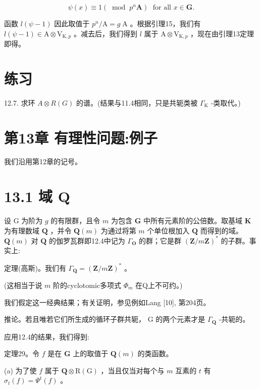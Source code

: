 \documentclass[10pt]{article}
\begin{document}
\[
\psi \left( x\right)  \equiv  1\left( {\;\operatorname{mod}\;{p}^{n}\mathbf{A}}\right) \;\text{ for all }x \in  \mathbf{G}.
\]

函数 \(l\left( {\psi  - 1}\right)\) 因此取值于 \({p}^{n}/\mathrm{A} = g\mathrm{\;A}\) 。根据引理15，我们有 \(l\left( {\psi  - 1}\right)  \in  \mathrm{A} \otimes  {\mathrm{V}}_{\mathrm{K},p}\) 。减去后，我们得到 \(l\) 属于 \(\mathrm{A} \otimes  {\mathrm{V}}_{\mathrm{K},p}\) ，现在由引理13定理即得。

\section*{练习}

12.7. 求环 \(A \otimes  R\left( G\right)\) 的谱。(结果与11.4相同，只是共轭类被 \({\Gamma }_{\mathrm{K}}\) -类取代。)

\section*{第13章 有理性问题:例子}

我们沿用第12章的记号。

\section*{13.1 域 \(\mathbf{Q}\)}

设 \(\mathrm{G}\) 为阶为 \(g\) 的有限群，且令 \(m\) 为包含 \(\mathbf{G}\) 中所有元素阶的公倍数。取基域 \(\mathbf{K}\) 为有理数域 \(\mathbf{Q}\) ，并令 \(\mathbf{Q}\left( m\right)\) 为通过将第 \(m\) 个单位根加入 \(\mathbf{Q}\) 而得到的域。 \(\mathbf{Q}\left( m\right)\) 对 \(\mathbf{Q}\) 的伽罗瓦群即12.4中记为 \({\Gamma }_{\mathbf{O}}\) 的群；它是群 \({\left( \mathbf{Z}/m\mathbf{Z}\right) }^{ * }\) 的子群。事实上:

定理(高斯)。我们有 \({\Gamma }_{\mathbf{Q}} = {\left( \mathbf{Z}/m\mathbf{Z}\right) }^{ * }\) 。

(这相当于说 \(m\) 阶的cyclotomic多项式 \({\Phi }_{m}\) 在Q上不可约。)

我们假定这一经典结果；有关证明，参见例如Lang [10], 第204页。

推论。若且唯若它们所生成的循环子群共轭， \(\mathrm{G}\) 的两个元素才是 \({\Gamma }_{\mathbf{Q}}\) -共轭的。

应用12.4的结果，我们得到:

定理29。令 \(f\) 是在 \(\mathbf{G}\) 上的取值于 \(\mathbf{Q}\left( m\right)\) 的类函数。

(a) 为了使 \(f\) 属于 \(\mathbf{Q} \otimes  \mathrm{R}\left( \mathrm{G}\right)\) ，当且仅当对每个与 \(m\) 互素的 \(t\) 有 \({\sigma }_{t}\left( f\right)  = {\Psi }^{t}\left( f\right)\) 。
\end{document}
